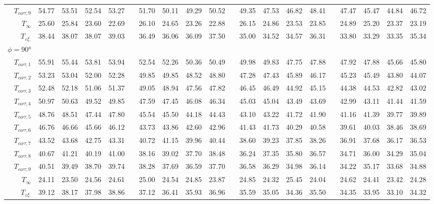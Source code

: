 \begin{landscape}
\begin{table*}
\begin{adjustbox}{width=1.4\textheight, center = \textheight}
\begin{tabular}{@{}rrrrrcrrrrcrrrrcrrrr@{}}
$\scriptstyle{T_{αντ, 9}}$ & 54.77 & 53.51 & 52.54 & 53.27 && 51.70 & 50.11 & 49.29 & 50.52 && 49.35 & 47.53 & 46.82 & 48.41 && 47.47 & 45.47 & 44.84 & 46.72\\ 
$\scriptstyle{T_{\infty}}$ & 25.60 & 25.84 & 23.60 & 22.69 && 26.10 & 24.65 & 23.26 & 22.88 && 26.15 & 24.86 & 23.53 & 23.85 && 24.89 & 25.20 & 23.37 & 23.19\\ 
$\scriptstyle{T_{εξ.}}$ & 38.44 & 38.07 & 38.07 & 39.03 && 36.49 & 36.06 & 36.09 & 37.50 && 35.00 & 34.52 & 34.57 & 36.31 && 33.80 & 33.29 & 33.35 & 35.34\\
$\phi=\ang{90}$\\
$\scriptstyle{T_{αντ, 1}}$ & 55.91 & 55.44 & 53.81 & 53.94 && 52.54 & 52.26 & 50.36 & 50.49 && 49.98 & 49.83 & 47.75 & 47.88 && 47.92 & 47.88 & 45.66 & 45.80\\ 
$\scriptstyle{T_{αντ, 2}}$ & 53.23 & 53.04 & 52.00 & 52.28 && 49.85 & 49.85 & 48.52 & 48.80 && 47.28 & 47.43 & 45.89 & 46.17 && 45.23 & 45.49 & 43.80 & 44.07\\ 
$\scriptstyle{T_{αντ, 3}}$ & 52.48 & 52.18 & 51.06 & 51.37 && 49.05 & 48.94 & 47.56 & 47.82 && 46.45 & 46.49 & 44.92 & 45.15 && 44.38 & 44.53 & 42.82 & 43.02\\\ 
$\scriptstyle{T_{αντ, 4}}$ & 50.97 & 50.63 & 49.52 & 49.85 && 47.59 & 47.45 & 46.08 & 46.34 && 45.03 & 45.04 & 43.49 & 43.69 && 42.99 & 43.11 & 41.44 & 41.59\\ 
$\scriptstyle{T_{αντ, 5}}$ & 48.76 & 48.51 & 47.44 & 47.80 && 45.54 & 45.50 & 44.18 & 44.43 && 43.10 & 43.22 & 41.72 & 41.90 && 41.16 & 41.39 & 39.77 & 39.89\\ 
$\scriptstyle{T_{αντ, 6}}$ & 46.76 & 46.66 & 45.66 & 46.12 && 43.73 & 43.86 & 42.60 & 42.96 && 41.43 & 41.73 & 40.29 & 40.58 && 39.61 & 40.03 & 38.46 & 38.69\\ 
$\scriptstyle{T_{αντ, 7}}$ & 43.52 & 43.68 & 42.75 & 43.31 && 40.72 & 41.15 & 39.96 & 40.44 && 38.60 & 39.23 & 37.85 & 38.26 && 36.91 & 37.68 & 36.17 & 36.53\\ 
$\scriptstyle{T_{αντ, 8}}$ & 40.67 & 41.21 & 40.19 & 41.00 && 38.16 & 39.02 & 37.70 & 38.48 && 36.24 & 37.35 & 35.80 & 36.57 && 34.71 & 36.00 & 34.29 & 35.04\\ 
$\scriptstyle{T_{αντ, 9}}$ & 40.51 & 39.49 & 38.70 & 39.74 && 38.28 & 37.69 & 36.59 & 37.70 && 36.58 & 36.29 & 34.98 & 36.14 && 34.22 & 35.17 & 33.68 & 34.88\\ 
$\scriptstyle{T_{\infty}}$ & 24.11 & 23.50 & 24.56 & 24.61 && 25.00 & 24.54 & 24.85 & 23.87 && 24.85 & 24.32 & 25.45 & 24.04 && 24.62 & 24.41 & 23.42 & 24.28\\ 
$\scriptstyle{T_{εξ.}}$ & 39.12 & 38.17 & 37.98 & 38.86 && 37.12 & 36.41 & 35.93 & 36.96 && 35.59 & 35.05 & 34.36 & 35.50 && 34.35 & 33.95 & 33.10 & 34.32\\
\bottomrule
\end{tabular}
\end{adjustbox}
\end{table*}



\end{landscape}
